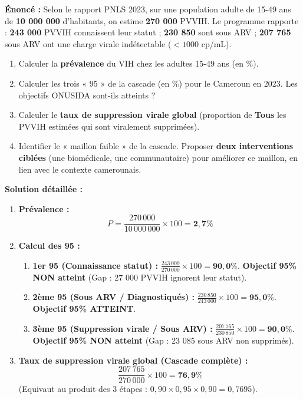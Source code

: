 \documentclass[11pt]{article}
\begin{document}
\begin{exoresolu}
\textbf{Énoncé :} Selon le rapport PNLS 2023, sur une population adulte de 15-49 ans de \textbf{10 000 000} d'habitants, on estime \textbf{270 000} PVVIH. Le programme rapporte : \textbf{243 000} PVVIH connaissent leur statut ; \textbf{230 850} sont sous ARV ; \textbf{207 765} sous ARV ont une charge virale indétectable ($< 1000$ cp/mL).
\begin{enumerate}
    \item Calculer la \textbf{prévalence} du VIH chez les adultes 15-49 ans (en \%). 
    \item Calculer les trois « 95 » de la cascade (en \%) pour le Cameroun en 2023. Les objectifs ONUSIDA sont-ils atteints ?
    \item Calculer le \textbf{taux de suppression virale global} (proportion de \textbf{Tous} les PVVIH estimées qui sont viralement supprimées).
    \item Identifier le « maillon faible » de la cascade. Proposer \textbf{deux interventions ciblées} (une biomédicale, une communautaire) pour améliorer ce maillon, en lien avec le contexte camerounais.
\end{enumerate}
\tcblower
\textbf{Solution détaillée :}
\begin{enumerate}
    \item \textbf{Prévalence :}
    \[
    P = \frac{270\,000}{10\,000\,000} \times 100 = \mathbf{2,7\%}
    \]
    \item \textbf{Calcul des 95 :}
    \begin{enumerate}
        \item \textbf{1er 95 (Connaissance statut) :} $\frac{243\,000}{270\,000} \times 100 = \mathbf{90,0\%}$. \textbf{Objectif 95\% NON atteint} (Gap : 27 000 PVVIH ignorent leur statut).
        \item \textbf{2ème 95 (Sous ARV / Diagnostiqués) :} $\frac{230\,850}{243\,000} \times 100 = \mathbf{95,0\%}$. \textbf{Objectif 95\% ATTEINT}.
        \item \textbf{3ème 95 (Suppression virale / Sous ARV) :} $\frac{207\,765}{230\,850} \times 100 = \mathbf{90,0\%}$. \textbf{Objectif 95\% NON atteint} (Gap : 23 085 sous ARV non supprimés).
    \end{enumerate}
    \item \textbf{Taux de suppression virale global (Cascade complète) :}
    \[
    \frac{207\,765}{270\,000} \times 100 = \mathbf{76,9\%}
    \]
    (Equivaut au produit des 3 étapes : $0,90 \times 0,95 \times 0,90 = 0,7695$).

\end{enumerate}
\end{exoresolu}
\end{document}
